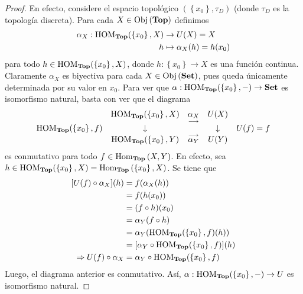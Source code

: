 \documentclass[12pt]{report}
\newcounter{it}
\theoremstyle{largebreak}
\newcommand\cf[3]{\ensuremath{#1:#2\rightarrow#3}}
\newcommand{\Obj}[1]{\ensuremath{\textup{Obj}\left(#1\right)}}
\newcommand{\Hom}[3]{\ensuremath{\textup{Hom}_{#1}\left(#2,#3\right)}}
\newcommand{\Cat}[1]{\ensuremath{\textup{\textbf{#1}}}}
\begin{document}
    \begin{proof}
        En efecto, considere el espacio topológico $(\left\{x_0\right\},\tau_D)$ (donde $\tau_D$ es la topología discreta). Para cada $X\in\Obj{\Cat{Top}}$ definimos
        \begin{equation*}
            \begin{split}
                \alpha_X:\HOM{\Cat{Top}}(\left\{x_0\right\},X)&\rightarrow U(X)=X\\
                h&\mapsto \alpha_X(h)=h(x_0)\\
            \end{split}
        \end{equation*}
        para todo $h\in\HOM{\Cat{Top}}(\left\{x_0\right\},X)$, donde $\cf{h}{\left\{x_0 \right\}}{X}$ es una función continua. Claramente $\alpha_X$ es biyectiva para cada $X\in\Obj{\Cat{Set}}$, pues queda únicamente determinada por su valor en $x_0$. Para ver que $\cf{\alpha}{\HOM{\Cat{Top}}(\left\{x_0\right\},-)}{\Cat{Set}}$ es isomorfismo natural, basta con ver que el diagrama
        \begin{equation*}
            \begin{array}{rcccl}
                & \HOM{\Cat{Top}}(\left\{x_0\right\},X) & \underset{\longrightarrow}{\alpha_{X}} & U(X) &\\
                \HOM{\Cat{Top}}(\left\{x_0\right\},f) & \downarrow & & \downarrow & U(f)=f \\
                & \HOM{\Cat{Top}}(\left\{x_0\right\},Y) & \overset{\longrightarrow}{\alpha_{Y}} & U(Y) &\\
            \end{array}
        \end{equation*}
        es conmutativo para todo $f\in\Hom{\Cat{Top}}{X}{Y}$. En efecto, sea $h\in\HOM{\Cat{Top}}(\left\{x_0\right\},X)=\Hom{\Cat{Top}}{\left\{x_0\right\}}{X}$. Se tiene que
        \begin{equation*}
            \begin{split}
                [U(f)\circ\alpha_X](h)&=f(\alpha_X(h))\\
                &=f(h(x_0))\\
                &=(f\circ h)(x_0)\\
                &=\alpha_Y(f\circ h)\\
                &=\alpha_Y(\HOM{\Cat{Top}}(\left\{x_0\right\},f)(h))\\
                &=[\alpha_Y\circ\HOM{\Cat{Top}}(\left\{x_0\right\},f)](h)\\
                \Rightarrow U(f)\circ\alpha_X&=\alpha_Y\circ\HOM{\Cat{Top}}(\left\{x_0\right\},f)\\
            \end{split}
        \end{equation*}
        Luego, el diagrama anterior es conmutativo. Así, $\cf{\alpha}{\HOM{\Cat{Top}}(\left\{x_0\right\},-)}{U}$ es isomorfismo natural.
    \end{proof}
\end{document}
